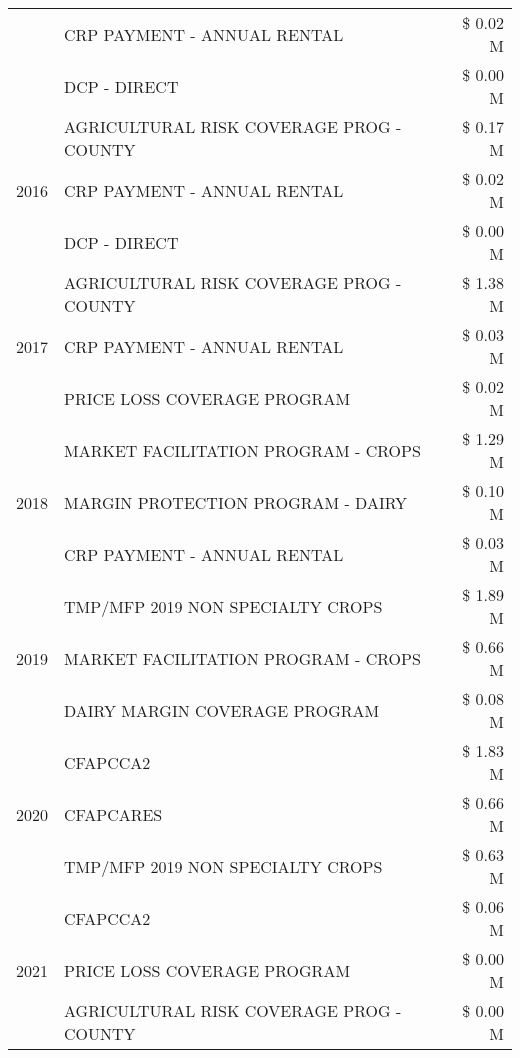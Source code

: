 \begin{tabular}{llr}
 & CRP PAYMENT - ANNUAL RENTAL & \$ 0.02 M \\
 & DCP - DIRECT & \$ 0.00 M \\
\cline{1-3}
\multirow[t]{3}{*}{2016} & AGRICULTURAL RISK COVERAGE PROG - COUNTY & \$ 0.17 M \\
 & CRP PAYMENT - ANNUAL RENTAL & \$ 0.02 M \\
 & DCP - DIRECT & \$ 0.00 M \\
\cline{1-3}
\multirow[t]{3}{*}{2017} & AGRICULTURAL RISK COVERAGE PROG - COUNTY & \$ 1.38 M \\
 & CRP PAYMENT - ANNUAL RENTAL & \$ 0.03 M \\
 & PRICE LOSS COVERAGE PROGRAM & \$ 0.02 M \\
\cline{1-3}
\multirow[t]{3}{*}{2018} & MARKET FACILITATION PROGRAM - CROPS & \$ 1.29 M \\
 & MARGIN PROTECTION PROGRAM - DAIRY & \$ 0.10 M \\
 & CRP PAYMENT - ANNUAL RENTAL & \$ 0.03 M \\
\cline{1-3}
\multirow[t]{3}{*}{2019} & TMP/MFP 2019 NON SPECIALTY CROPS & \$ 1.89 M \\
 & MARKET FACILITATION PROGRAM - CROPS & \$ 0.66 M \\
 & DAIRY MARGIN COVERAGE PROGRAM & \$ 0.08 M \\
\cline{1-3}
\multirow[t]{3}{*}{2020} & CFAPCCA2 & \$ 1.83 M \\
 & CFAPCARES & \$ 0.66 M \\
 & TMP/MFP 2019 NON SPECIALTY CROPS & \$ 0.63 M \\
\cline{1-3}
\multirow[t]{3}{*}{2021} & CFAPCCA2 & \$ 0.06 M \\
 & PRICE LOSS COVERAGE PROGRAM & \$ 0.00 M \\
 & AGRICULTURAL RISK COVERAGE PROG - COUNTY & \$ 0.00 M \\
\cline{1-3}
\bottomrule
\end{tabular}
